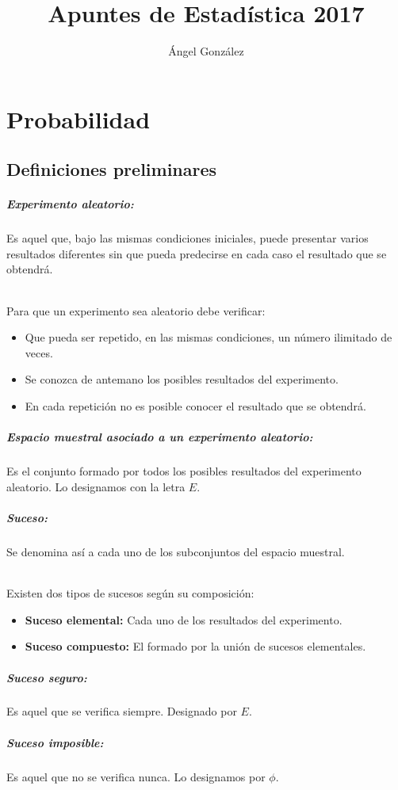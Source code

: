 \documentclass[12pt,a4paper,oneside,onecolumn,titlepage]{book}
\author{Ángel González}
\title{Apuntes de Estadística 2017}
\begin{document}
\chapter{Probabilidad}
\section{Definiciones preliminares}
\paragraph{Experimento aleatorio:}
Es aquel que, bajo las mismas condiciones iniciales, puede presentar varios resultados diferentes sin que pueda predecirse en cada caso el resultado que se obtendrá.
\subparagraph{}
Para que un experimento sea aleatorio debe verificar:
\begin{itemize}
\item Que pueda ser repetido, en las mismas condiciones, un número ilimitado de veces.
\item Se conozca de antemano los posibles resultados del experimento.
\item En cada repetición no es posible conocer el resultado que se obtendrá.
\end{itemize}
\paragraph{Espacio muestral asociado a un experimento aleatorio:}
Es el conjunto formado por todos los posibles resultados del experimento aleatorio. Lo designamos con la letra $E$.
\paragraph{Suceso:} Se denomina así a cada uno de los subconjuntos del espacio muestral.
\subparagraph{}
Existen dos tipos de sucesos según su composición:
\begin{itemize}
\item \textbf{Suceso elemental:} Cada uno de los resultados del experimento.
\item \textbf{Suceso compuesto:} El formado por la unión de sucesos elementales.
\end{itemize}
\paragraph{Suceso seguro:}
Es aquel que se verifica siempre. Designado por $E$.
\paragraph{Suceso imposible:}
Es aquel que no se verifica nunca. Lo designamos por $\phi$.
\end{document}
